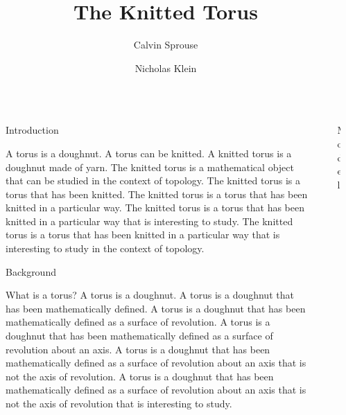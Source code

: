 \documentclass{beamer}
\title{The Knitted Torus}
\author{Calvin Sprouse \and Nicholas Klein}
\institute[CWU]{Department of Mathematics, Central Washington University}
\newlength{\sepwidth}
\newlength{\colwidth}
\newcommand{\separatorcolumn}{\begin{column}{\sepwidth}\end{column}}
\begin{document}
\begin{frame}[t]
\begin{columns}[t]
\separatorcolumn%


\begin{column}{\colwidth}

\begin{block}{Introduction}

A torus is a doughnut. A torus can be knitted. A knitted torus is a doughnut made of yarn. The knitted torus is a mathematical object that can be studied in the context of topology. The knitted torus is a torus that has been knitted. The knitted torus is a torus that has been knitted in a particular way. The knitted torus is a torus that has been knitted in a particular way that is interesting to study. The knitted torus is a torus that has been knitted in a particular way that is interesting to study in the context of topology.

\end{block}

\begin{block}{Background}

What is a torus? A torus is a doughnut. A torus is a doughnut that has been mathematically defined. A torus is a doughnut that has been mathematically defined as a surface of revolution. A torus is a doughnut that has been mathematically defined as a surface of revolution about an axis. A torus is a doughnut that has been mathematically defined as a surface of revolution about an axis that is not the axis of revolution. A torus is a doughnut that has been mathematically defined as a surface of revolution about an axis that is not the axis of revolution that is interesting to study.

\end{block}

\end{column}
\separatorcolumn%


\begin{column}{\colwidth}

\begin{block}{Model}


\end{block}
\end{column}
\end{columns}
\end{frame}
\end{document}
